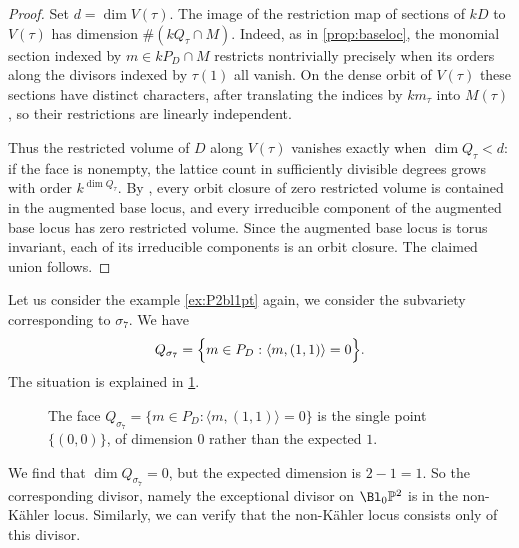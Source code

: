 \begin{proof}
Set $d=\dim V(\tau)$. The image of the restriction map of sections of $kD$ to $V(\tau)$ has dimension $\#(kQ_\tau\cap M)$. Indeed, as in \cref{prop:baseloc}, the monomial section indexed by $m\in kP_D\cap M$ restricts nontrivially precisely when its orders along the divisors indexed by $\tau(1)$ all vanish. On the dense orbit of $V(\tau)$ these sections have distinct characters, after translating the indices by $km_\tau$ into $M(\tau)$, so their restrictions are linearly independent.

Thus the restricted volume of $D$ along $V(\tau)$ vanishes exactly when $\dim Q_\tau<d$: if the face is nonempty, the lattice count in sufficiently divisible degrees grows with order $k^{\dim Q_\tau}$. By \cite[Corollary~5.9]{ELMNP09}, every orbit closure of zero restricted volume is contained in the augmented base locus, and every irreducible component of the augmented base locus has zero restricted volume. Since the augmented base locus is torus invariant, each of its irreducible components is an orbit closure. The claimed union follows.
\end{proof}


\begin{example}\label{ex:P2bl_nK}
    Let us consider the example \cref{ex:P2bl1pt} again, we consider the subvariety corresponding to $\sigma_7$. We have
    \[
    Q_{\sigma_7}=\Bigl\{m\in P_D: \langle m,(1,1) \rangle=0 \Bigr\}.
    \]
    The situation is explained in \cref{fig:Qsigma7}.
    \begin{figure}[ht]
        \centering
        \caption{The face $Q_{\sigma_7}=\{m\in P_D:\langle m,(1,1)\rangle=0\}$ is the single point $\{(0,0)\}$, of dimension $0$ rather than the expected $1$.}
        \label{fig:Qsigma7}
    \end{figure}
    We find that $\dim Q_{\sigma_7}=0$, but the expected dimension is $2-1=1$. So the corresponding divisor, namely the exceptional divisor on $\Bl_0\mathbb{P}^2$ is in the non-Kähler locus. Similarly, we can verify that the non-Kähler locus consists only of this divisor.
\end{example}




